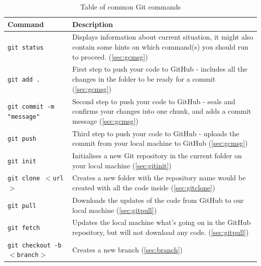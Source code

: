 \begin{table}[H]
    \centering
    \caption{Table of common Git commands}
    \vspace{6mm}
    \begin{tabular}{|m{7em}|m{23em}|}
        \hline
        \textbf{Command} & 
        Description 
        \\ \hline \hline
        
        \texttt{git status} &
        Displays information about current situation, it might also contain some hints on which command(s) you should run to proceed. (\cref{sec:gcmsg})
        \\ \hline
        
        \texttt{git add .} &
        First step to push your code to GitHub - includes all the changes in the folder to be ready for a commit (\cref{sec:gcmsg})
        \\ \hline
        
        \texttt{git commit -m "message"} &
        Second step to push your code to GitHub - seals and confirms your changes into one chunk, and adds a commit message (\cref{sec:gcmsg})
        \\ \hline
        
        \texttt{git push} &
        Third step to push your code to GitHub - uploads the commit from your local machine to GitHub (\cref{sec:gcmsg})
        \\ \hline
        
        \texttt{git init} &
        Initialises a new Git repository in the current folder on your local machine (\cref{sec:gitinit})
        \\ \hline
        
        \texttt{git clone $<$url$>$} &
        Creates a new folder with the repository name would be created with all the code inside (\cref{sec:gitclone})
        \\ \hline
        
        \texttt{git pull} &
        Downloads the updates of the code from GitHub to our local machine (\cref{sec:gitpull})
        \\ \hline
        
        \texttt{git fetch} &
        Updates the local machine what's going on in the GitHub repository, but will not download any code. (\cref{sec:gitpull})
        \\ \hline
        
        \texttt{git checkout -b $<$branch$>$} &
        Creates a new branch (\cref{sec:branch})
        \\ \hline
        

\end{tabular}
\end{table}
